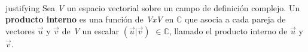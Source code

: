 \documentclass[preview]{standalone}
\begin{document}
\begin{center}
\quad\\justifying {Sea \textit{V} un espacio vectorial sobre un campo de definición complejo. Un \textbf{producto interno} es una función de \textit{VxV} en $\mathbb{C}$ que asocia a cada pareja de vectores $\vec{u}$ y $\vec{v}$ de \textit{V} un escalar $(\vec{u} | \vec{v})$ $\in \mathbb{C}$, llamado el producto interno de  $\vec{u}$ y $\vec{v}$.}
\end{center}
\end{document}
